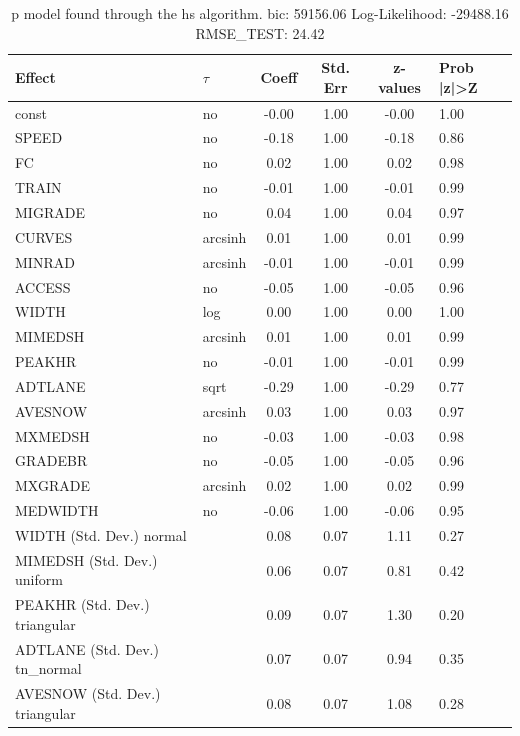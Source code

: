 \begin{table}
	\caption{p model found through the hs algorithm. bic: 59156.06 Log-Likelihood: -29488.16 RMSE_TEST: 24.42}
	\begin{center}
		\begin{tabular}{|l|l|c|c|c|l|}
			\hline
			Effect & $\tau$ & Coeff & Std. Err & z-values & Prob |z|>Z \\
			\hline
			const & no & -0.00 & 1.00 & -0.00 & 1.00 \\
			\hline
			SPEED & no & -0.18 & 1.00 & -0.18 & 0.86 \\
			\hline
			FC & no & 0.02 & 1.00 & 0.02 & 0.98 \\
			\hline
			TRAIN & no & -0.01 & 1.00 & -0.01 & 0.99 \\
			\hline
			MIGRADE & no & 0.04 & 1.00 & 0.04 & 0.97 \\
			\hline
			CURVES & arcsinh & 0.01 & 1.00 & 0.01 & 0.99 \\
			\hline
			MINRAD & arcsinh & -0.01 & 1.00 & -0.01 & 0.99 \\
			\hline
			ACCESS & no & -0.05 & 1.00 & -0.05 & 0.96 \\
			\hline
			WIDTH & log & 0.00 & 1.00 & 0.00 & 1.00 \\
			\hline
			MIMEDSH & arcsinh & 0.01 & 1.00 & 0.01 & 0.99 \\
			\hline
			PEAKHR & no & -0.01 & 1.00 & -0.01 & 0.99 \\
			\hline
			ADTLANE & sqrt & -0.29 & 1.00 & -0.29 & 0.77 \\
			\hline
			AVESNOW & arcsinh & 0.03 & 1.00 & 0.03 & 0.97 \\
			\hline
			MXMEDSH & no & -0.03 & 1.00 & -0.03 & 0.98 \\
			\hline
			GRADEBR & no & -0.05 & 1.00 & -0.05 & 0.96 \\
			\hline
			MXGRADE & arcsinh & 0.02 & 1.00 & 0.02 & 0.99 \\
			\hline
			MEDWIDTH & no & -0.06 & 1.00 & -0.06 & 0.95 \\
			\hline
			WIDTH (Std. Dev.) normal &  & 0.08 & 0.07 & 1.11 & 0.27 \\
			\hline
			MIMEDSH (Std. Dev.) uniform &  & 0.06 & 0.07 & 0.81 & 0.42 \\
			\hline
			PEAKHR (Std. Dev.) triangular &  & 0.09 & 0.07 & 1.30 & 0.20 \\
			\hline
			ADTLANE (Std. Dev.) tn_normal &  & 0.07 & 0.07 & 0.94 & 0.35 \\
			\hline
			AVESNOW (Std. Dev.) triangular &  & 0.08 & 0.07 & 1.08 & 0.28 \\

\end{tabular}
\end{center}
\end{table}
